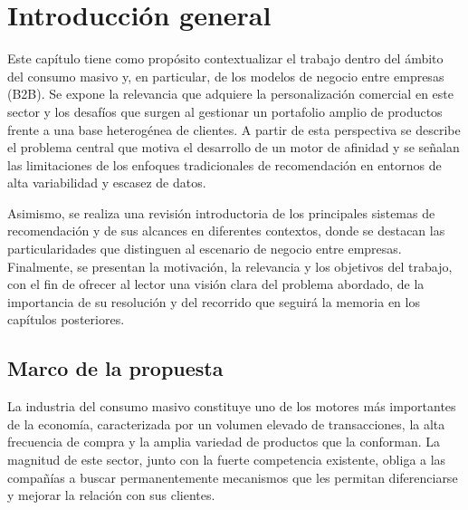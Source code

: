 
\chapter{Introducción general} %

\label{Chapter1} %
\label{IntroGeneral}

Este capítulo tiene como propósito contextualizar el trabajo dentro del ámbito del consumo masivo y, en particular, de los modelos de negocio entre empresas (B2B). Se expone la relevancia que adquiere la personalización comercial en este sector y los desafíos que surgen al gestionar un portafolio amplio de productos frente a una base heterogénea de clientes. A partir de esta perspectiva se describe el problema central que motiva el desarrollo de un motor de afinidad y se señalan las limitaciones de los enfoques tradicionales de recomendación en entornos de alta variabilidad y escasez de datos.

Asimismo, se realiza una revisión introductoria de los principales sistemas de
recomendación y de sus alcances en diferentes contextos, donde se destacan las
particularidades que distinguen al escenario de negocio entre empresas. Finalmente, se presentan la motivación, la relevancia y los objetivos del trabajo, con el fin de ofrecer al lector una visión clara del problema abordado, de la importancia de su resolución y del recorrido que seguirá la memoria en los capítulos posteriores.


\newcommand{\keyword}[1]{\textbf{#1}}
\newcommand{\tabhead}[1]{\textbf{#1}}
\newcommand{\code}[1]{\texttt{#1}}
\newcommand{\file}[1]{\texttt{\bfseries#1}}
\newcommand{\option}[1]{\texttt{\itshape#1}}
\newcommand{\grados}{$^{\circ}$}


\section{Marco de la propuesta}

La industria del consumo masivo constituye uno de los motores más importantes de la economía, caracterizada por un volumen elevado de transacciones, la alta frecuencia de compra y la amplia variedad de productos que la conforman. La magnitud de este sector, junto con la fuerte competencia existente, obliga a las compañías a buscar permanentemente mecanismos que les permitan diferenciarse y mejorar la relación con sus clientes.


